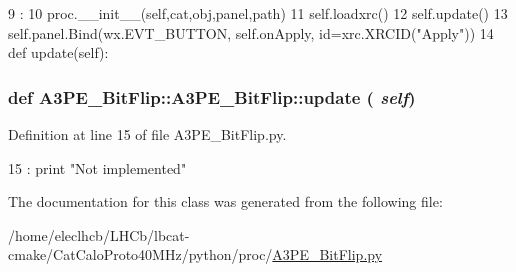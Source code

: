 \begin{DoxyCode}
9                                              :
10         proc.__init__(self,cat,obj,panel,path)
11         self.loadxrc()
12         self.update()
13         self.panel.Bind(wx.EVT_BUTTON, self.onApply, id=xrc.XRCID("Apply"))
14 
    def update(self):
\end{DoxyCode}
\hypertarget{classA3PE__BitFlip_1_1A3PE__BitFlip_aa4833495c63cefcb48337cae8ecc171c}{
\subsubsection[{update}]{\setlength{\rightskip}{0pt plus 5cm}def A3PE\_\-BitFlip::A3PE\_\-BitFlip::update ( {\em self})}}
\label{classA3PE__BitFlip_1_1A3PE__BitFlip_aa4833495c63cefcb48337cae8ecc171c}


Definition at line 15 of file A3PE\_\-BitFlip.py.


\begin{DoxyCode}
15 :
    print "Not implemented"
\end{DoxyCode}


The documentation for this class was generated from the following file:\begin{DoxyCompactItemize}
\item 
/home/eleclhcb/LHCb/lbcat-\/cmake/CatCaloProto40MHz/python/proc/\hyperlink{A3PE__BitFlip_8py}{A3PE\_\-BitFlip.py}\end{DoxyCompactItemize}
